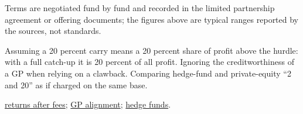 \begin{qfdefinition}
 Terms are negotiated fund by fund and recorded in the limited partnership agreement or offering documents; the figures above are typical ranges reported by the sources, not standards.

 Assuming a 20 percent carry means a 20 percent share of profit above the hurdle: with a full catch-up it is 20 percent of all profit. Ignoring the creditworthiness of a GP when relying on a clawback. Comparing hedge-fund and private-equity ``2 and 20'' as if charged on the same base.

 \hyperref[meth:alternative-returns-after-fees]{returns after fees}; \hyperref[meth:gp-alignment-net-returns]{GP alignment}; \hyperref[def:hedge-fund-features]{hedge funds}.

\end{qfdefinition}

